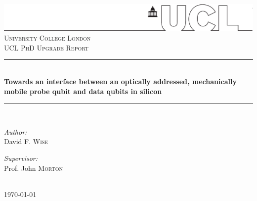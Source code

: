 \begin{titlepage}
\vspace*{-1in}\hspace*{-1.5in}\includegraphics[width=1.02\paperwidth]{UCLlogo}
\newcommand{\HRule}{\rule{\linewidth}{0.5mm}} %
\null\vfil
\center %
 \textsc{\LARGE University College London}
\\[1cm]
\textsc{\Large UCL PhD Upgrade Report}\\[0.5cm] %


\HRule \\[0.2cm]
{\LARGE \bfseries Towards an interface between an optically addressed, mechanically mobile probe qubit and data qubits in silicon}\\[-0.2cm]
\HRule \\[1.2cm]

\begin{minipage}[t]{0.4\textwidth}
\begin{flushleft} \large
\emph{Author:}\\
David F. \textsc{Wise}%
\end{flushleft}
\end{minipage}
\begin{minipage}[t]{0.4\textwidth}
\begin{flushright} \large
\emph{Supervisor:} \\
Prof. John \textsc{Morton} \\%
\end{flushright}
\end{minipage}\\[2cm]

{\large \today}\\%


\null\vfil %
\end{titlepage}
